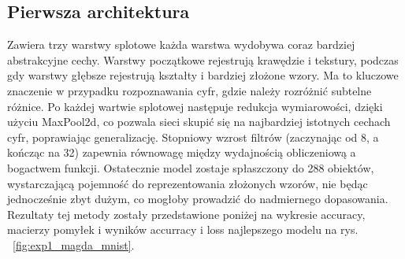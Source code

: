 \documentclass[10pt]{article}
\begin{document}
\subsection*{Pierwsza architektura}
Zawiera trzy warstwy splotowe każda warstwa wydobywa coraz bardziej abstrakcyjne cechy. Warstwy początkowe rejestrują krawędzie i tekstury, podczas gdy warstwy głębsze rejestrują kształty i bardziej złożone wzory. Ma to kluczowe znaczenie w przypadku rozpoznawania cyfr, gdzie należy rozróżnić subtelne różnice.
Po każdej wartwie splotowej następuje redukcja wymiarowości, dzięki użyciu MaxPool2d, co pozwala sieci skupić się na najbardziej istotnych cechach cyfr, poprawiając generalizację.
Stopniowy wzrost filtrów (zaczynając od 8, a kończąc na 32) zapewnia równowagę między wydajnością obliczeniową a bogactwem funkcji.
Ostatecznie model zostaje spłaszczony do 288 obiektów, wystarczającą pojemność do reprezentowania złożonych wzorów, nie będąc jednocześnie zbyt dużym, co mogłoby prowadzić do nadmiernego dopasowania.
Rezultaty tej metody zostały przedstawione poniżej na wykresie accuracy, macierzy pomyłek i wyników accurracy i loss najlepszego modelu na rys. ~\ref{fig:exp1_magda_mnist}.

\MagdaMnistLarge{}
\end{document}
